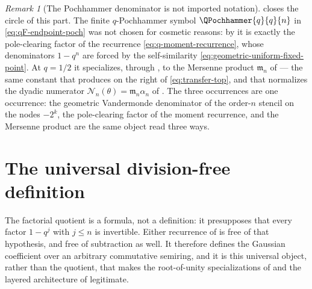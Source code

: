 \documentclass[11pt,a4paper,oneside,openany]{book}
\theoremstyle{definition}
\theoremstyle{remark}
\newtheorem{remark}[remark]{Remark}
\begin{document}
\begin{remark}[The Pochhammer denominator is not imported notation]\label{rem:qF-not-imported}
 closes the circle of this part.  The finite $q$-Pochhammer
symbol $\QPochhammer{q}{q}{n}$ in \eqref{eq:qF-endpoint-poch} was not chosen for cosmetic reasons: by
 it is exactly the pole-clearing
factor of the recurrence \eqref{eq:q-moment-recurrence}, whose denominators $1-q^n$ are forced
by the self-similarity \eqref{eq:geometric-uniform-fixed-point}.  At $q=1/2$ it specializes,
through , to the Mersenne product $\mathfrak m_n$ of
 --- the same constant that
 produces on the right of \eqref{eq:transfer-top}, and
that normalizes the dyadic numerator $\mathcal N_n(\theta)=\mathfrak m_n\alpha_n$ of
.  The three occurrences are one occurrence: the geometric
Vandermonde denominator of the order-$n$ stencil on the nodes $-2^k$, the pole-clearing factor
of the moment recurrence, and the Mersenne product are the same object read three ways.
\end{remark}



\section{The universal division-free definition}

The factorial quotient is a formula, not a definition: it presupposes that every factor $1-q^j$ with $j\le n$ is invertible.  Either recurrence of  is free of that hypothesis, and free of subtraction as well.  It therefore defines the Gaussian coefficient over an arbitrary commutative semiring, and it is this universal object, rather than the quotient, that makes the root-of-unity specializations of  and the layered architecture of  legitimate.
\end{document}
